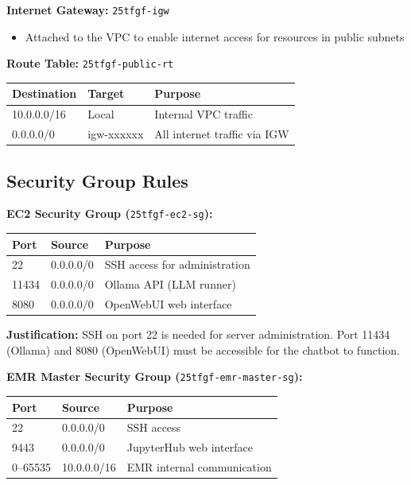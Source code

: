 \documentclass[11pt,a4paper]{article}
\begin{document}
\textbf{Internet Gateway:} \texttt{25tfgf-igw}
\begin{itemize}[nosep]
    \item Attached to the VPC to enable internet access for resources in public subnets
\end{itemize}

\textbf{Route Table:} \texttt{25tfgf-public-rt}
\begin{table}[H]
\centering
\begin{tabular}{@{}lll@{}}
\toprule
\textbf{Destination} & \textbf{Target} & \textbf{Purpose} \\
\midrule
10.0.0.0/16 & Local & Internal VPC traffic \\
0.0.0.0/0 & igw-xxxxxx & All internet traffic via IGW \\
\bottomrule
\end{tabular}
\end{table}

\subsection{Security Group Rules}

\textbf{EC2 Security Group (}\texttt{25tfgf-ec2-sg}\textbf{):}
\begin{table}[H]
\centering
\begin{tabular}{@{}lll@{}}
\toprule
\textbf{Port} & \textbf{Source} & \textbf{Purpose} \\
\midrule
22 & 0.0.0.0/0 & SSH access for administration \\
11434 & 0.0.0.0/0 & Ollama API (LLM runner) \\
8080 & 0.0.0.0/0 & OpenWebUI web interface \\
\bottomrule
\end{tabular}
\end{table}

\textbf{Justification:} SSH on port 22 is needed for server administration. Port 11434 (Ollama) and 8080 (OpenWebUI) must be accessible for the chatbot to function.

\textbf{EMR Master Security Group (}\texttt{25tfgf-emr-master-sg}\textbf{):}
\begin{table}[H]
\centering
\begin{tabular}{@{}lll@{}}
\toprule
\textbf{Port} & \textbf{Source} & \textbf{Purpose} \\
\midrule
22 & 0.0.0.0/0 & SSH access \\
9443 & 0.0.0.0/0 & JupyterHub web interface \\
0--65535 & 10.0.0.0/16 & EMR internal communication \\
\bottomrule
\end{tabular}
\end{table}
\end{document}
